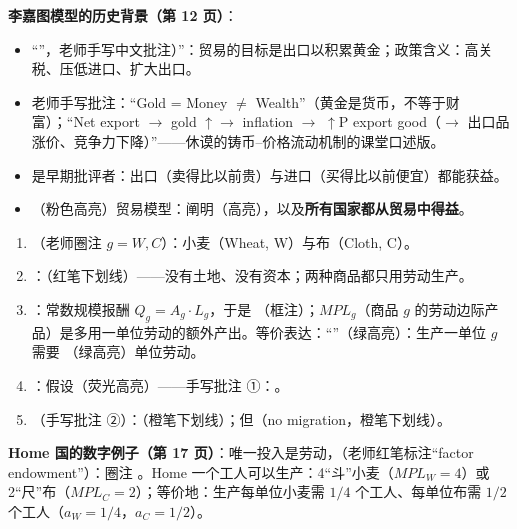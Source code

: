 \textbf{李嘉图模型的历史背景（第 12 页）}：
\begin{itemize}
  \item ``''，老师手写中文批注）''：贸易的目标是出口以积累黄金；政策含义：高关税、压低进口、扩大出口。
  \item 老师手写批注：``Gold = Money $\neq$ Wealth''（黄金是货币，不等于财富）；``Net export $\to$ gold $\uparrow \to$ inflation $\to$ $\uparrow$P export good（$\to$ 出口品涨价、竞争力下降）''——休谟的铸币--价格流动机制的课堂口述版。
  \item {}是早期批评者：出口（卖得比以前贵）与进口（买得比以前便宜）都能获益。
  \item {}（粉色高亮）贸易模型：阐明（高亮），以及\textbf{所有国家都从贸易中得益}。
\end{itemize}


\begin{assumpbox}[李嘉图模型设定（第 14--16 页）]
\begin{enumerate}
  \item {}（老师圈注 $g = W, C$）：小麦（Wheat, W）与布（Cloth, C）。
  \item {}：（红笔下划线）——没有土地、没有资本；两种商品都只用劳动生产。
  \item {}：常数规模报酬 $Q_g = A_g \cdot L_g$，于是 （框注）；$MPL_g$（商品 $g$ 的劳动边际产品）是多用一单位劳动的额外产出。等价表达：``''（绿高亮）：生产一单位 $g$ 需要 （绿高亮）单位劳动。
  \item {}：假设（荧光高亮）——手写批注 ①：。
  \item {}（手写批注 ②）：（橙笔下划线）；但（no migration，橙笔下划线）。
\end{enumerate}
\end{assumpbox}

\textbf{Home 国的数字例子（第 17 页）}：唯一投入是劳动，（老师红笔标注``factor endowment''）：圈注 。Home 一个工人可以生产：4``斗''小麦（$MPL_W = 4$）或 2``尺''布（$MPL_C = 2$）；等价地：生产每单位小麦需 $1/4$ 个工人、每单位布需 $1/2$ 个工人（$a_W = 1/4$，$a_C = 1/2$）。

